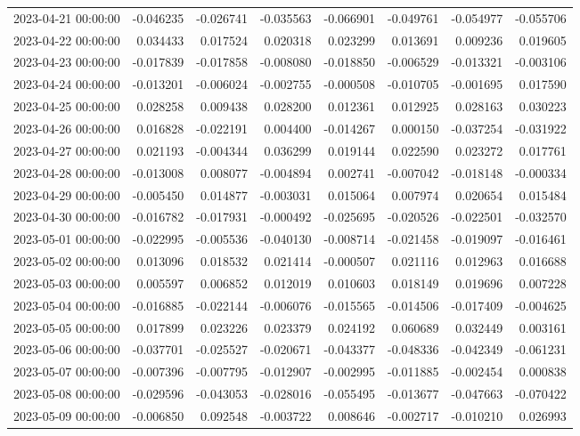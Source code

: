 \begin{tabular}{lrrrrrrr}
2023-04-21 00:00:00 & -0.046235 & -0.026741 & -0.035563 & -0.066901 & -0.049761 & -0.054977 & -0.055706 \\
2023-04-22 00:00:00 & 0.034433 & 0.017524 & 0.020318 & 0.023299 & 0.013691 & 0.009236 & 0.019605 \\
2023-04-23 00:00:00 & -0.017839 & -0.017858 & -0.008080 & -0.018850 & -0.006529 & -0.013321 & -0.003106 \\
2023-04-24 00:00:00 & -0.013201 & -0.006024 & -0.002755 & -0.000508 & -0.010705 & -0.001695 & 0.017590 \\
2023-04-25 00:00:00 & 0.028258 & 0.009438 & 0.028200 & 0.012361 & 0.012925 & 0.028163 & 0.030223 \\
2023-04-26 00:00:00 & 0.016828 & -0.022191 & 0.004400 & -0.014267 & 0.000150 & -0.037254 & -0.031922 \\
2023-04-27 00:00:00 & 0.021193 & -0.004344 & 0.036299 & 0.019144 & 0.022590 & 0.023272 & 0.017761 \\
2023-04-28 00:00:00 & -0.013008 & 0.008077 & -0.004894 & 0.002741 & -0.007042 & -0.018148 & -0.000334 \\
2023-04-29 00:00:00 & -0.005450 & 0.014877 & -0.003031 & 0.015064 & 0.007974 & 0.020654 & 0.015484 \\
2023-04-30 00:00:00 & -0.016782 & -0.017931 & -0.000492 & -0.025695 & -0.020526 & -0.022501 & -0.032570 \\
2023-05-01 00:00:00 & -0.022995 & -0.005536 & -0.040130 & -0.008714 & -0.021458 & -0.019097 & -0.016461 \\
2023-05-02 00:00:00 & 0.013096 & 0.018532 & 0.021414 & -0.000507 & 0.021116 & 0.012963 & 0.016688 \\
2023-05-03 00:00:00 & 0.005597 & 0.006852 & 0.012019 & 0.010603 & 0.018149 & 0.019696 & 0.007228 \\
2023-05-04 00:00:00 & -0.016885 & -0.022144 & -0.006076 & -0.015565 & -0.014506 & -0.017409 & -0.004625 \\
2023-05-05 00:00:00 & 0.017899 & 0.023226 & 0.023379 & 0.024192 & 0.060689 & 0.032449 & 0.003161 \\
2023-05-06 00:00:00 & -0.037701 & -0.025527 & -0.020671 & -0.043377 & -0.048336 & -0.042349 & -0.061231 \\
2023-05-07 00:00:00 & -0.007396 & -0.007795 & -0.012907 & -0.002995 & -0.011885 & -0.002454 & 0.000838 \\
2023-05-08 00:00:00 & -0.029596 & -0.043053 & -0.028016 & -0.055495 & -0.013677 & -0.047663 & -0.070422 \\
2023-05-09 00:00:00 & -0.006850 & 0.092548 & -0.003722 & 0.008646 & -0.002717 & -0.010210 & 0.026993 \\

\end{tabular}
